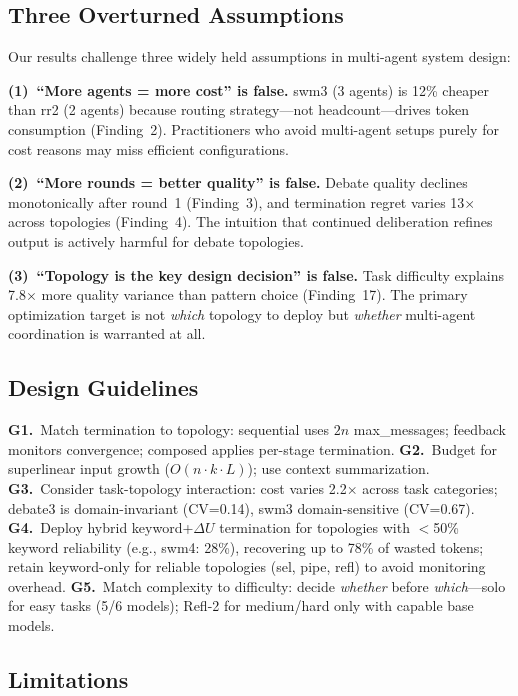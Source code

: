 \documentclass{article}
\begin{document}
\subsection{Three Overturned Assumptions}
\vspace{-1mm}

Our results challenge three widely held assumptions in multi-agent system design:

\textbf{(1)~``More agents = more cost'' is false.} swm3 (3 agents) is 12\% cheaper than rr2 (2 agents) because routing strategy---not headcount---drives token consumption (Finding~2). Practitioners who avoid multi-agent setups purely for cost reasons may miss efficient configurations.

\textbf{(2)~``More rounds = better quality'' is false.} Debate quality declines monotonically after round~1 (Finding~3), and termination regret varies 13$\times$ across topologies (Finding~4). The intuition that continued deliberation refines output is actively harmful for debate topologies.

\textbf{(3)~``Topology is the key design decision'' is false.} Task difficulty explains 7.8$\times$ more quality variance than pattern choice (Finding~17). The primary optimization target is not \emph{which} topology to deploy but \emph{whether} multi-agent coordination is warranted at all.

\subsection{Design Guidelines}
\vspace{-1mm}

\textbf{G1.}~Match termination to topology: sequential uses $2n$ max\_messages; feedback monitors convergence; composed applies per-stage termination.
\textbf{G2.}~Budget for superlinear input growth ($O(n \cdot k \cdot L)$); use context summarization.
\textbf{G3.}~Consider task-topology interaction: cost varies 2.2$\times$ across task categories; debate3 is domain-invariant (CV=0.14), swm3 domain-sensitive (CV=0.67).
\textbf{G4.}~Deploy hybrid keyword+$\Delta U$ termination for topologies with $<$50\% keyword reliability (e.g., swm4: 28\%), recovering up to 78\% of wasted tokens; retain keyword-only for reliable topologies (sel, pipe, refl) to avoid monitoring overhead.
\textbf{G5.}~Match complexity to difficulty: decide \emph{whether} before \emph{which}---solo for easy tasks (5/6 models); Refl-2 for medium/hard only with capable base models.

\subsection{Limitations}
\vspace{-1mm}
\end{document}

